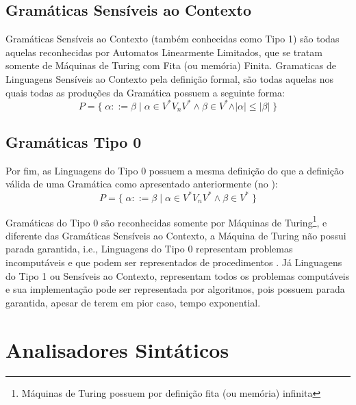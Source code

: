 {\subsection*{Gramáticas Sensíveis ao Contexto}

    Gramáticas Sensíveis ao Contexto (também conhecidas como Tipo 1) são
    todas aquelas reconhecidas por Automatos Linearmente Limitados,
    que se tratam somente de Máquinas de Turing com Fita (ou memória) Finita.
    Gramaticas de Linguagens Sensíveis ao Contexto pela definição formal,
    são todas aquelas nos quais todas as produções da Gramática possuem a seguinte forma:
    $$ P = \{\; \alpha ::= \beta \;|\; \alpha \in V^* V_n V^* \land \beta \in V^*
                \land \vert\alpha\vert \leq \vert\beta\vert \;\} $$


\subsection*{Gramáticas Tipo 0}

    Por fim,
    as Linguagens do Tipo 0 possuem a mesma definição do que a definição
    válida de uma Gramática como apresentado anteriormente (no
    ):
    $$ P = \{\; \alpha ::= \beta \;|\; \alpha \in V^* V_n V^* \land \beta \in V^* \;\} $$

    Gramáticas do Tipo 0 são reconhecidas somente por Máquinas de Turing\footnote{Máquinas
    de Turing possuem por definição fita (ou memória) infinita
    },
    e diferente das Gramáticas Sensíveis ao Contexto,
    a Máquina de Turing não possui parada garantida,
    i.e.,
    Linguagens do Tipo 0 representam problemas incomputáveis e
    que podem ser representados de procedimentos \cite{sipserBook}.
    Já Linguagens do Tipo 1 ou Sensíveis ao Contexto,
    representam todos os problemas computáveis e
    sua implementação pode ser representada por algoritmos,
    pois possuem parada garantida,
    apesar de terem em pior caso,
    tempo exponential.


\section{Analisadores Sintáticos}
\label{analisadoresSintaticos}

}
